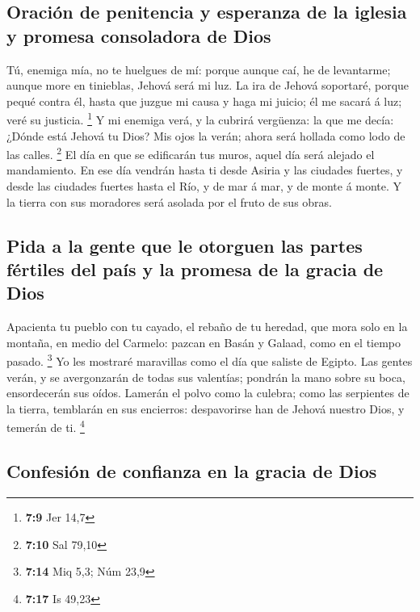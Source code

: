 \hypertarget{oraciuxf3n-de-penitencia-y-esperanza-de-la-iglesia-y-promesa-consoladora-de-dios}{%
\subsection{Oración de penitencia y esperanza de la iglesia y promesa
consoladora de
Dios}\label{oraciuxf3n-de-penitencia-y-esperanza-de-la-iglesia-y-promesa-consoladora-de-dios}}

 Tú, enemiga mía, no te huelgues de mí: porque aunque caí,
he de levantarme; aunque more en tinieblas, Jehová será mi luz.
 La ira de Jehová soportaré, porque pequé contra él, hasta
que juzgue mi causa y haga mi juicio; él me sacará á luz; veré su
justicia. \footnote{\textbf{7:9} Jer 14,7}  Y mi enemiga
verá, y la cubrirá vergüenza: la que me decía: ¿Dónde está Jehová tu
Dios? Mis ojos la verán; ahora será hollada como lodo de las calles.
\footnote{\textbf{7:10} Sal 79,10}  El día en que se
edificarán tus muros, aquel día será alejado el mandamiento.
 En ese día vendrán hasta ti desde Asiria y las ciudades
fuertes, y desde las ciudades fuertes hasta el Río, y de mar á mar, y de
monte á monte.  Y la tierra con sus moradores será asolada
por el fruto de sus obras.

\hypertarget{pida-a-la-gente-que-le-otorguen-las-partes-fuxe9rtiles-del-pauxeds-y-la-promesa-de-la-gracia-de-dios}{%
\subsection{Pida a la gente que le otorguen las partes fértiles del país
y la promesa de la gracia de
Dios}\label{pida-a-la-gente-que-le-otorguen-las-partes-fuxe9rtiles-del-pauxeds-y-la-promesa-de-la-gracia-de-dios}}

 Apacienta tu pueblo con tu cayado, el rebaño de tu
heredad, que mora solo en la montaña, en medio del Carmelo: pazcan en
Basán y Galaad, como en el tiempo pasado. \footnote{\textbf{7:14} Miq
  5,3; Núm 23,9}  Yo les mostraré maravillas como el día
que saliste de Egipto.  Las gentes verán, y se avergonzarán
de todas sus valentías; pondrán la mano sobre su boca, ensordecerán sus
oídos.  Lamerán el polvo como la culebra; como las
serpientes de la tierra, temblarán en sus encierros: despavorirse han de
Jehová nuestro Dios, y temerán de ti. \footnote{\textbf{7:17} Is 49,23}

\hypertarget{confesiuxf3n-de-confianza-en-la-gracia-de-dios}{%
\subsection{Confesión de confianza en la gracia de
Dios}\label{confesiuxf3n-de-confianza-en-la-gracia-de-dios}}

